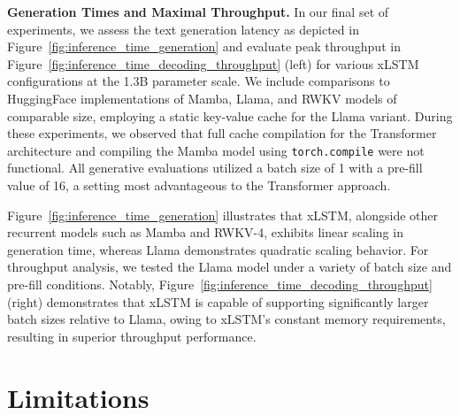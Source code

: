 \textbf{Generation Times and Maximal Throughput.} In our final set of experiments, we assess the text generation latency as depicted in Figure~\ref{fig:inference_time_generation} and evaluate peak throughput in Figure~\ref{fig:inference_time_decoding_throughput} (left) for various xLSTM configurations at the 1.3B parameter scale. We include comparisons to HuggingFace implementations of Mamba, Llama, and RWKV models of comparable size, employing a static key-value cache for the Llama variant. During these experiments, we observed that full cache compilation for the Transformer architecture and compiling the Mamba model using \texttt{torch.compile} were not functional. All generative evaluations utilized a batch size of 1 with a pre-fill value of 16, a setting most advantageous to the Transformer approach.

Figure~\ref{fig:inference_time_generation} illustrates that xLSTM, alongside other recurrent models such as Mamba and RWKV-4, exhibits linear scaling in generation time, whereas Llama demonstrates quadratic scaling behavior. For throughput analysis, we tested the Llama model under a variety of batch size and pre-fill conditions. Notably, Figure~\ref{fig:inference_time_decoding_throughput} (right) demonstrates that xLSTM is capable of supporting significantly larger batch sizes relative to Llama, owing to xLSTM’s constant memory requirements, resulting in superior throughput performance.

\section{Limitations}

